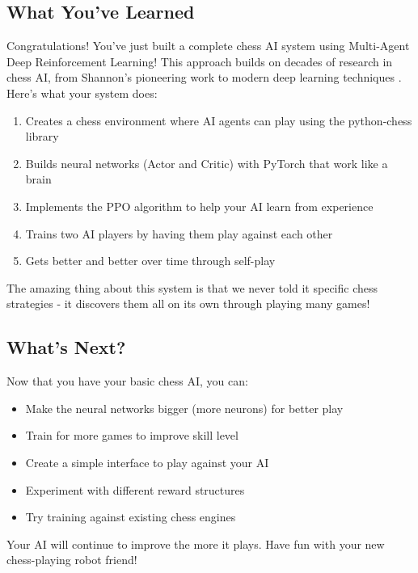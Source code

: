 \documentclass[11pt]{article}
\begin{document}
\subsection{What You've Learned}

Congratulations! You've just built a complete chess AI system using Multi-Agent Deep Reinforcement Learning! This approach builds on decades of research in chess AI, from Shannon's pioneering work \cite{shannon1950} to modern deep learning techniques \cite{silver2018}. Here's what your system does:

\begin{enumerate}
    \item Creates a chess environment where AI agents can play using the python-chess library \cite{python-chess}
    \item Builds neural networks (Actor and Critic) with PyTorch \cite{pytorch} that work like a brain
    \item Implements the PPO algorithm \cite{schulman2017} to help your AI learn from experience
    \item Trains two AI players by having them play against each other
    \item Gets better and better over time through self-play
\end{enumerate}

The amazing thing about this system is that we never told it specific chess strategies - it discovers them all on its own through playing many games!

\subsection{What's Next?}

Now that you have your basic chess AI, you can:
\begin{itemize}
    \item Make the neural networks bigger (more neurons) for better play
    \item Train for more games to improve skill level
    \item Create a simple interface to play against your AI
    \item Experiment with different reward structures
    \item Try training against existing chess engines
\end{itemize}

Your AI will continue to improve the more it plays. Have fun with your new chess-playing robot friend!
\end{document}
